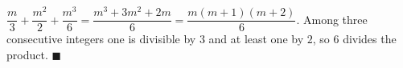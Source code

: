 $\dfrac m3+\dfrac{m^2}2+\dfrac{m^3}6=\dfrac{m^3+3m^2+2m}6=\dfrac{m(m+1)(m+2)}6$. Among three consecutive integers one is divisible by $3$ and at least one by $2$, so $6$ divides the product. $\blacksquare$
